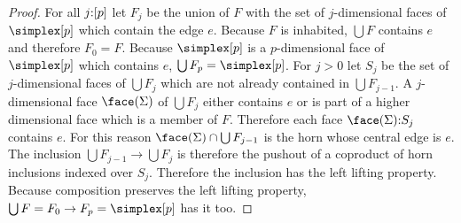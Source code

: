 \documentclass[csh.tex]{subfiles}
\begin{document}
\begin{proof} For all $j\mathord :[p]$ let $F_j$ be the union of $F$ with the set of $j$-dimensional faces of $\simplex[p]$ which contain the edge $e$. Because $F$ is inhabited, $\bigcup F$ contains $e$ and therefore $F_0=F$. Because $\simplex[p]$ is a $p$-dimensional face of $\simplex[p]$ which contains $e$, $\bigcup F_p = \simplex[p]$. For $j>0$ let $S_j$ be the set of $j$-dimensional faces of $\bigcup F_j$ which are not already contained in $\bigcup F_{j-1}$. A $j$-dimensional face $\face(\Sigma)$ of $\bigcup F_j$ either contains $e$ or is part of a higher dimensional face which is a member of $F$. Therefore each face $\face(\Sigma)\of S_j$ contains $e$. For this reason $\face(\Sigma)\cap \bigcup F_{j-1}$ is the horn whose central edge is $e$. The inclusion $\bigcup F_{j-1}\to\bigcup F_j$ is therefore the pushout of a coproduct of horn inclusions indexed over $S_j$. Therefore the inclusion has the left lifting property. Because composition preserves the left lifting property, $\bigcup F = F_0\to F_p = \simplex[p]$ has it too. 
\end{proof}
\end{document}
